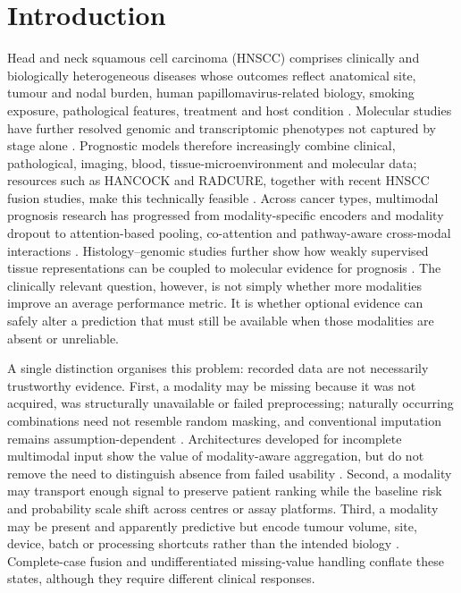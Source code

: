 \documentclass[pdflatex,sn-nature]{sn-jnl}
\begin{document}
\section{Introduction}
Head and neck squamous cell carcinoma (HNSCC) comprises clinically and biologically heterogeneous diseases whose outcomes reflect anatomical site, tumour and nodal burden, human papillomavirus-related biology, smoking exposure, pathological features, treatment and host condition \cite{ang2010,bernier2004,cooper2004}. Molecular studies have further resolved genomic and transcriptomic phenotypes not captured by stage alone \cite{tcga2015,liu2018,wichmann2015,lohavanichbutr2013}. Prognostic models therefore increasingly combine clinical, pathological, imaging, blood, tissue-microenvironment and molecular data; resources such as HANCOCK and RADCURE, together with recent HNSCC fusion studies, make this technically feasible \cite{dorrich2025,welch2024,tian2025}. Across cancer types, multimodal prognosis research has progressed from modality-specific encoders and modality dropout to attention-based pooling, co-attention and pathway-aware cross-modal interactions \cite{baltrusaitis2019,neverova2016,ilse2018,cheerla2019,chen2021mcat,jaume2024survpath,meng2024}. Histology--genomic studies further show how weakly supervised tissue representations can be coupled to molecular evidence for prognosis \cite{mobadersany2018,courtiol2019,huang2022pathomic,lu2021clam,chen2022pancancer}. The clinically relevant question, however, is not simply whether more modalities improve an average performance metric. It is whether optional evidence can safely alter a prediction that must still be available when those modalities are absent or unreliable.

A single distinction organises this problem: recorded data are not necessarily trustworthy evidence. First, a modality may be missing because it was not acquired, was structurally unavailable or failed preprocessing; naturally occurring combinations need not resemble random masking, and conventional imputation remains assumption-dependent \cite{sterne2009,little2012}. Architectures developed for incomplete multimodal input show the value of modality-aware aggregation, but do not remove the need to distinguish absence from failed usability \cite{neverova2016,havaei2016}. Second, a modality may transport enough signal to preserve patient ranking while the baseline risk and probability scale shift across centres or assay platforms. Third, a modality may be present and apparently predictive but encode tumour volume, site, device, batch or processing shortcuts rather than the intended biology \cite{geirhos2020,oakdenrayner2020,roberts2021,ongly2024}. Complete-case fusion and undifferentiated missing-value handling conflate these states, although they require different clinical responses.
\end{document}
